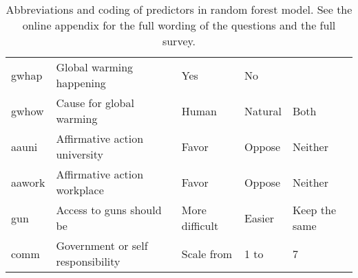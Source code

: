 \begin{table}[ht]
\begin{tabular}{lllll}
gwhap     & Global warming happening                   & Yes                                    & No            &               \\
gwhow     & Cause for global warming                   & Human                                  & Natural       & Both          \\
aauni     & Affirmative action university              & Favor                                  & Oppose        & Neither       \\
aawork    & Affirmative action workplace               & Favor                                  & Oppose        & Neither       \\
gun       & Access to guns should be                   & More difficult                         & Easier        & Keep the same \\
comm      & Government or self responsibility          & Scale from   							&  1        to  &   7           \\
\hline
\end{tabular}
\caption{Abbreviations and coding of predictors in random forest model. See the online appendix for the full wording of the questions and the full survey.}
\label{tab:predictors}
\end{table}